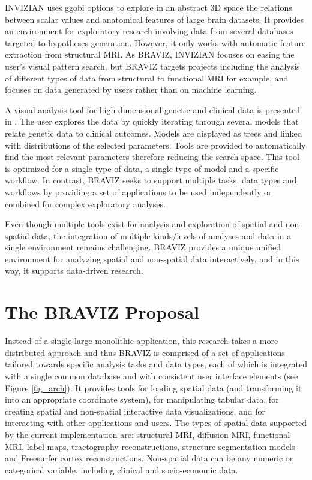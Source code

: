 \documentclass[twocolumn]{svjour3}
\begin{document}
INVIZIAN \cite{bowman_query-based_2011}\cite{bowman_feature-similarity_2012}\cite{bowman_visual_2012} uses ggobi options to explore in an abstract 3D space the relations between scalar values and anatomical features of large brain datasets. It provides an environment for exploratory research involving data from several databases targeted to hypotheses generation. However, it only works with automatic feature extraction from structural MRI. As BRAVIZ, INVIZIAN focuses on easing the user’s visual pattern search, but BRAVIZ targets projects including the analysis of different types of data from structural to functional MRI for example, and focuses on data generated by users rather than on machine learning. 


A visual analysis tool for high dimensional genetic and clinical data is presented in \cite{hinterberg_peax:_2014}. The user explores the data by quickly iterating through several models that relate genetic data to clinical outcomes. Models are displayed as trees and linked with distributions of the selected parameters. Tools are provided to automatically find the most relevant parameters therefore reducing the search space. This tool is optimized for a single type of data, a single type of model and a specific workflow. In contrast, BRAVIZ seeks to support multiple tasks, data types and workflows by providing a set of  applications to be used independently or combined for complex exploratory analyses.
	
Even though multiple tools  exist for analysis and exploration of spatial and non-spatial data, the integration of multiple kinds/levels of analyses and data in a single environment remains challenging. BRAVIZ provides a unique unified environment for analyzing spatial and non-spatial data interactively, and in this way, it supports data-driven research.

\section{The BRAVIZ Proposal}

Instead of a single large monolithic application, this research takes a more distributed approach and thus BRAVIZ is comprised of a set of applications tailored towards specific analysis tasks and data types, each of which is integrated with a single common database and with consistent user interface elements (see Figure \ref{fig_arch}). It provides tools for loading spatial data (and transforming it into an appropriate coordinate system), for manipulating tabular data, for creating spatial and non-spatial interactive data visualizations, and for interacting with other applications and users. The types of spatial-data supported by the current implementation are: structural MRI, diffusion MRI, functional MRI, label maps, tractography reconstructions, structure segmentation models and Freesurfer cortex reconstructions. Non-spatial data can be any numeric or categorical variable, including clinical and socio-economic data.
\end{document}
